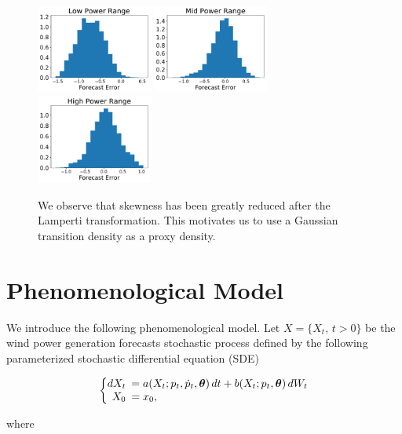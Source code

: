 \documentclass[11pt,english]{article}
\begin{document}
\begin{figure}
  \includegraphics[width=38mm,scale=1]{plots/hist_low_lamperti.pdf}
  \includegraphics[width=38mm,scale=1]{plots/hist_mid_lamperti.pdf}
  \includegraphics[width=38mm,scale=1]{plots/hist_high_lamperti.pdf}
  \caption{We observe that skewness has been greatly reduced after the Lamperti transformation. This motivates us to use a Gaussian transition density as a proxy density.}
  \label{fig:skew_after_lamperti}
\end{figure}

\section{Phenomenological  Model} \label{Section_2}

We introduce the following phenomenological model. Let $X = \{X_t, \, t>0\}$  be the  wind power generation forecasts stochastic process defined by the following parameterized stochastic differential equation (SDE)

\begin{equation}
  \left\{
  \begin{array}{@{}rl@{}}
    dX_t \!\!\!&=  a(X_t; p_t, \dot{p}_t,\bm{\theta}) \,dt + b (X_t; p_t, \bm{\theta} ) \,dW_t  \\
     X_0  \!\!\!&=  x_0,
  \end{array}\right. \label{eq:main}
\end{equation} 

where
\end{document}
